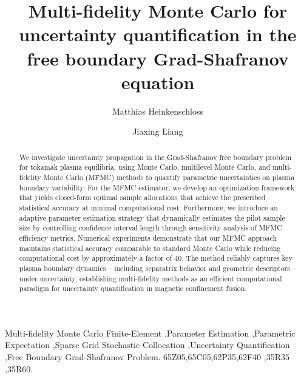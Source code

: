 \documentclass[final,3p,times,11pt]{elsarticle}
\begin{document}
\begin{frontmatter}
\title{Multi-fidelity Monte Carlo for uncertainty quantification in the free boundary Grad-Shafranov equation}


\author[umdcs]{Matthias Heinkenschloss}
\address[umdcs]{Department of Computational Applied Mathematics \& Operations Research, Rice University.}
\author[umdm]{Jiaxing Liang}
\address[umdm]{Department of Computational Applied Mathematics \& Operations Research, Rice University.}
\begin{abstract}
We investigate uncertainty propagation in the Grad-Shafranov free boundary problem for tokamak plasma equilibria, using Monte Carlo, multilevel Monte Carlo, and multi-fidelity Monte Carlo (MFMC) methods to quantify parametric uncertainties on plasma boundary variability. For the MFMC estimator, we develop an optimization framework that yields closed-form optimal sample allocations that achieve the prescribed statistical accuracy at minimal computational cost. Furthermore, we introduce an adaptive parameter estimation strategy that dynamically estimates the pilot sample size by controlling confidence interval length through sensitivity analysis of MFMC efficiency metrics. Numerical experiments demonstrate that our MFMC approach maintains statistical accuracy comparable to standard Monte Carlo while reducing computational cost by approximately a factor of 40. The method reliably captures key plasma boundary dynamics -- including separatrix behavior and geometric descriptors -- under uncertainty, establishing multi-fidelity methods as an efficient computational paradigm for uncertainty quantification in magnetic confinement fusion.  
\end{abstract}

\begin{keyword}
Multi-fidelity Monte Carlo Finite-Element \sep Parameter Estimation \sep Parametric Expectation \sep Sparse Grid Stochastic Collocation \sep Uncertainty Quantification \sep Free Boundary Grad-Shafranov Problem.
%
\MSC[2020] 65Z05\sep 65C05\sep 62P35\sep 62F40 \sep 35R35 \sep 35R60.
\end{keyword}
\end{frontmatter}

 
 












% 

\end{document}
